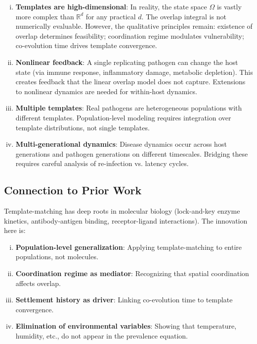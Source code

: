 \documentclass[11pt,twocolumn,a4paper]{article}
\newcommand{\R}{\mathbb{R}}
\begin{document}
\begin{enumerate}[(i)]
\item \textbf{Templates are high-dimensional}: In reality, the state space $\Omega$ is vastly more complex than $\R^d$ for any practical $d$. The overlap integral is not numerically evaluable. However, the qualitative principles remain: existence of overlap determines feasibility; coordination regime modulates vulnerability; co-evolution time drives template convergence.

\item \textbf{Nonlinear feedback}: A single replicating pathogen can change the host state (via immune response, inflammatory damage, metabolic depletion). This creates feedback that the linear overlap model does not capture. Extensions to nonlinear dynamics are needed for within-host dynamics.

\item \textbf{Multiple templates}: Real pathogens are heterogeneous populations with different templates. Population-level modeling requires integration over template distributions, not single templates.

\item \textbf{Multi-generational dynamics}: Disease dynamics occur across host generations and pathogen generations on different timescales. Bridging these requires careful analysis of re-infection vs. latency cycles.
\end{enumerate}

\subsection{Connection to Prior Work}

Template-matching has deep roots in molecular biology (lock-and-key enzyme kinetics, antibody-antigen binding, receptor-ligand interactions). The innovation here is:
\begin{enumerate}[(i)]
\item \textbf{Population-level generalization}: Applying template-matching to entire populations, not molecules.
\item \textbf{Coordination regime as mediator}: Recognizing that spatial coordination affects overlap.
\item \textbf{Settlement history as driver}: Linking co-evolution time to template convergence.
\item \textbf{Elimination of environmental variables}: Showing that temperature, humidity, etc., do not appear in the prevalence equation.
\end{enumerate}
\end{document}
